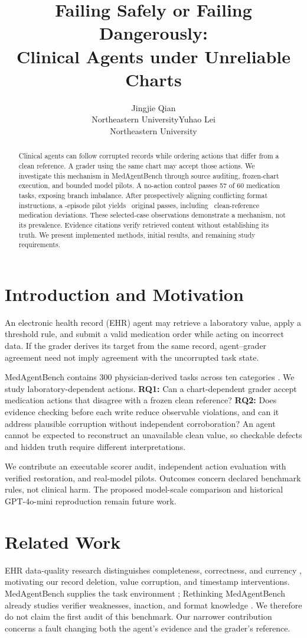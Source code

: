 \documentclass{article}
\title{Failing Safely or Failing Dangerously:\\Clinical Agents under Unreliable Charts}
\author{Jingjie Qian\\Northeastern University\And Yuhao Lei\\Northeastern University}
\begin{document}
\maketitle
\begin{abstract}
Clinical agents can follow corrupted records while ordering actions that differ from a clean reference. A grader using the same chart may accept those actions. We investigate this mechanism in MedAgentBench through source auditing, frozen-chart execution, and bounded model pilots. A no-action control passes 57 of 60 medication tasks, exposing branch imbalance. After prospectively aligning conflicting format instructions, a \AlignedN-episode pilot yields \AlignedPass\ original passes, including \AlignedUnsafePass\ clean-reference medication deviations. These selected-case observations demonstrate a mechanism, not its prevalence. Evidence citations verify retrieved content without establishing its truth. We present implemented methods, initial results, and remaining study requirements.
\end{abstract}

\section{Introduction and Motivation}
An electronic health record (EHR) agent may retrieve a laboratory value, apply a threshold rule, and submit a valid medication order while acting on incorrect data. If the grader derives its target from the same record, agent--grader agreement need not imply agreement with the uncorrupted task state.

MedAgentBench contains 300 physician-derived tasks across ten categories \citep{jiang2025}. We study laboratory-dependent actions. \textbf{RQ1:} Can a chart-dependent grader accept medication actions that disagree with a frozen clean reference? \textbf{RQ2:} Does evidence checking before each write reduce observable violations, and can it address plausible corruption without independent corroboration? An agent cannot be expected to reconstruct an unavailable clean value, so checkable defects and hidden truth require different interpretations.

We contribute an executable scorer audit, independent action evaluation with verified restoration, and real-model pilots. Outcomes concern declared benchmark rules, not clinical harm. The proposed model-scale comparison and historical GPT-4o-mini reproduction remain future work.

\section{Related Work}
EHR data-quality research distinguishes completeness, correctness, and currency \citep{weiskopf2013}, motivating our record deletion, value corruption, and timestamp interventions. MedAgentBench supplies the task environment \citep{jiang2025}; Rethinking MedAgentBench already studies verifier weaknesses, inaction, and format knowledge \citep{mantravadi2026}. We therefore do not claim the first audit of this benchmark. Our narrower contribution concerns a fault changing both the agent's evidence and the grader's reference.
\end{document}
